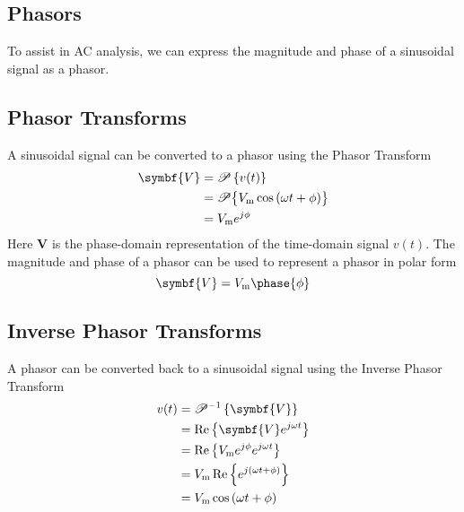 \documentclass{article}
\begin{document}
\subsection{Phasors}
\begin{definition}
    To assist in AC analysis, we can express the magnitude and phase of a sinusoidal signal
    as a phasor. 
\end{definition}
\subsection{Phasor Transforms}
\begin{definition}
    A sinusoidal signal can be converted to a phasor using the Phasor Transform
    \begin{align*}
        \symbf{V} &= \mathscr{P}\left\{ v(t) \right\} \\
        &= \mathscr{P}\bigl\{ V_{\mathrm{m}}\cos{\left( \omega t + \phi \right)} \bigr\} \\
        &= V_{\mathrm{m}} \e^{j\phi}
    \end{align*}
    Here $\symbf{V}$ is the phase-domain representation of the
    time-domain signal $v(t)$. 
    The magnitude and phase of a phasor can be used to represent a phasor in polar form
    \begin{equation*}
        \symbf{V} = V_{\mathrm{m}} \phase{\phi}
    \end{equation*}
\end{definition}
\subsection{Inverse Phasor Transforms}
\begin{definition}
    A phasor can be converted back to a sinusoidal signal using the Inverse Phasor Transform
    \begin{align*}
        v(t) &= \mathscr{P}^{-1}\left\{ \symbf{V} \right\} \\
        &= \Re\left\{ \symbf{V} \e^{j\omega t} \right\} \\
        &= \Re\left\{ V_{\mathrm{m}} \e^{j\phi} \e^{j\omega t} \right\} \\
        &= V_{\mathrm{m}}\Re\left\{ \e^{j\left( \omega t + \phi \right)} \right\} \\
        &= V_{\mathrm{m}}\cos{\left( \omega t + \phi \right)} \\
    \end{align*}
\end{definition}
\end{document}
